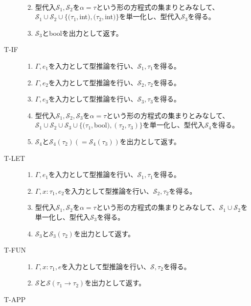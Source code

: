 \documentclass{jarticle}
\begin{document}
\begin{description}
\begin{enumerate}
　　\item 型代入$\mathcal{S}_{1},\mathcal{S}_{2}$を$\alpha=\tau$という形の方程式の集まりとみなして、$\mathcal{S}_{1} \cup \mathcal{S}_{2} \cup \{(\tau_{1},$int$),(\tau_{2},$int$)\}$を単一化し、型代入$\mathcal{S}_{3}$を得る。
  \item $\mathcal{S}_{3}$とboolを出力として返す。
  \end{enumerate}
\item[T-IF]
  \begin{enumerate}
  \item $\Gamma,e_{1}$を入力として型推論を行い、$\mathcal{S}_{1},\tau_{1}$を得る。
　　\item $\Gamma,e_{2}$を入力として型推論を行い、$\mathcal{S}_{2},\tau_{2}$を得る。
  \item $\Gamma,e_{3}$を入力として型推論を行い、$\mathcal{S}_{3},\tau_{3}$を得る。
　　\item 型代入$\mathcal{S}_{1},\mathcal{S}_{2},\mathcal{S}_{3}$を$\alpha=\tau$という形の方程式の集まりとみなして、$\mathcal{S}_{1} \cup \mathcal{S}_{2} \cup \mathcal{S}_{3} \cup \{(\tau_{1},$bool$),(\tau_{2},\tau_{3})\}$を単一化し、型代入$\mathcal{S}_{4}$を得る。
  \item $\mathcal{S}_{4}$と$\mathcal{S}_{4}(\tau_{2})(=\mathcal{S}_{4}(\tau_{3}))$を出力として返す。
  \end{enumerate}
\item[T-LET]
  \begin{enumerate}
  \item $\Gamma,e_{1}$を入力として型推論を行い、$\mathcal{S}_{1},\tau_{1}$を得る。
　　\item $\Gamma,x : \tau_{1},e_{2}$を入力として型推論を行い、$\mathcal{S}_{2},\tau_{2}$を得る。
　　\item 型代入$\mathcal{S}_{1},\mathcal{S}_{2}$を$\alpha=\tau$という形の方程式の集まりとみなして、$\mathcal{S}_{1} \cup \mathcal{S}_{2}$を単一化し、型代入$\mathcal{S}_{3}$を得る。
  \item $\mathcal{S}_{3}$と$\mathcal{S}_{3}(\tau_{2})$を出力として返す。
  \end{enumerate}
\item[T-FUN]
  \begin{enumerate}
  \item $\Gamma,x : \tau_{1},e$を入力として型推論を行い、$\mathcal{S},\tau_{2}$を得る。
  \item $\mathcal{S}$と$\mathcal{S}(\tau_{1} \rightarrow \tau_{2})$を出力として返す。
  \end{enumerate}
\item[T-APP]

\end{description}
\end{document}
